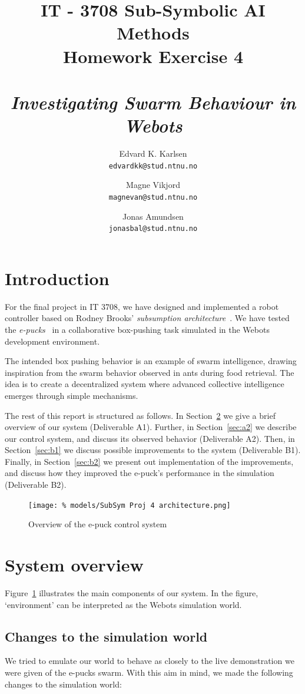 \documentclass[a4paper,10pt]{article}
\title{
    IT - 3708 Sub-Symbolic AI Methods \\
    Homework Exercise 4\\
    ~\\
    \emph{Investigating Swarm Behaviour in Webots}
}
\author{
    Edvard K. Karlsen \\
    \texttt{edvardkk@stud.ntnu.no}
    \and
    Magne Vikjord \\
    \texttt{magnevan@stud.ntnu.no}
    \and
    Jonas Amundsen \\
    \texttt{jonasbal@stud.ntnu.no}
}
\date {}
\begin{document}
\maketitle

\section{Introduction}
For the final project in IT 3708, we have designed and implemented a robot
controller based on Rodney Brooks' \emph{subsumption
architecture}~\cite{brooks1986}.  We have tested the
\emph{e-pucks}~\cite{bonani2009} in a collaborative box-pushing task simulated
in the Webots development environment.  

The intended box pushing behavior is an example of swarm intelligence, drawing
inspiration from the swarm behavior observed in ants during food retrieval.
The idea is to create a decentralized system where advanced collective
intelligence emerges through simple mechanisms.

The rest of this report is structured as follows. In Section~\ref{sec:a1} we
give a brief overview of our system (Deliverable A1).  Further, in
Section~\ref{sec:a2} we describe our control system, and discuss its observed
behavior (Deliverable A2). Then, in Section~\ref{sec:b1} we discuss possible
improvements to the system (Deliverable B1). Finally, in Section~\ref{sec:b2}
we present out implementation of the improvements, and discuss how they
improved the e-puck's performance in the simulation (Deliverable B2).

\begin{figure}[!h]
  \centering
  \texttt{[image: \%
    models/SubSym Proj 4 architecture.png]}
    \caption{Overview of the e-puck control system}
  \label{fig:architecture}
\end{figure}

\section{System overview}
\label{sec:a1}

Figure~\ref{fig:architecture} illustrates the main components of our system.
In the figure, `environment' can be interpreted as the Webots simulation
world.

\subsection{Changes to the simulation world}
We tried to emulate our world to behave as closely to the live demonstration
we were given of the e-pucks swarm. With this aim in mind, we made the
following changes to the simulation world:
\end{document}
